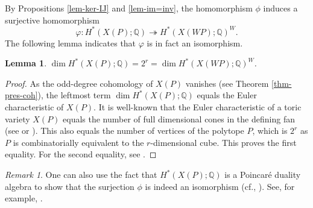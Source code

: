 \documentclass{amsart}
\newtheorem{lemma}[theorem]{Lemma}
\theoremstyle{definition}
\theoremstyle{remark}
\newtheorem{remark}[theorem]{Remark}
\numberwithin{equation}{section}
\begin{document}
By Propositions \ref{lem-ker-IJ} and \ref{lem-im=inv}, the homomorphism $\phi$ induces a surjective homomorphism
\[\varphi: H^*\left(X(P) ; \mathbb{Q}\right) \twoheadrightarrow H^*\left(X(\mathit{WP}) ; \mathbb{Q}\right)^W.\]
The following lemma indicates that $\varphi$ is in fact an isomorphism.

\begin{lemma} \label{lem-dim}
    $\dim H^*\left(X(P) ; \mathbb{Q}\right) = 2^r = \dim H^*\left(X(\mathit{WP}) ; \mathbb{Q}\right)^W$.
\end{lemma}

\begin{proof}
    As the odd-degree cohomology of $X(P)$ vanishes (see Theorem \ref{thm-pres-coh}), the leftmost term $\dim H^*\left(X(P) ; \mathbb{Q}\right)$ equals the Euler characteristic of $X(P)$. 
    It is well-known that the Euler characteristic of a toric variety $X(P)$ equals the number of full dimensional cones in the defining fan (see \cite[sections 11 and 12]{danilov1978geometry} or \cite[sections 3.2 and 4.5]{fulton1993introduction}). 
    This also equals the number of vertices of the polytope $P$, which is $2^r$ as $P$ is combinatorially equivalent to the $r$-dimensional cube. 
    This proves the first equality. 
    For the second equality, see \cite[Theorem 3.5(ii)]{lehrer2008rational}.
\end{proof}

\begin{remark}
    One can also use the fact that $H^*\left(X(P) ; \mathbb{Q}\right)$ is a Poincar\'e duality algebra to show that the surjection $\phi$ is indeed an isomorphism (cf., \cite{HMSS21-toric-orbifolds, Song22}).
    See, for example, \cite[Definition 10.4, Lemma 10.5]{abe19cohomology}.
\end{remark}
\end{document}
